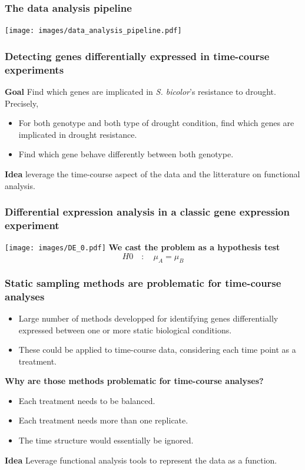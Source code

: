 \documentclass[xcolor=dvipsnames]{beamer}
\begin{document}
\begin{frame}
\frametitle{The data analysis pipeline}
\begin{center}
\texttt{[image: images/data\_analysis\_pipeline.pdf]}
\end{center}
\end{frame}

\begin{frame}
\frametitle{Detecting genes differentially expressed in time-course
experiments}

\textbf{\color{Blue} Goal} \quad Find which genes are implicated in \textit{S.
bicolor}'s resistance to drought. Precisely,
\begin{itemize}[label={$\bullet$}]
\item For both genotype and both type of drought condition, find which genes
are implicated in drought resistance.
\item Find which gene behave differently between both genotype.
\end{itemize}
\vspace{1em}

\textbf{\color{Blue} Idea} \quad leverage the time-course aspect of the data and the
litterature on functional analysis.
\end{frame}

\begin{frame}
\frametitle{Differential expression analysis in a classic gene expression experiment}
\texttt{[image: images/DE\_0.pdf]}
\vspace{-5em}
{\bf We cast the problem as a hypothesis test}
\begin{equation*}
H0 \quad : \quad \mu_A = \mu_B
\end{equation*}
\end{frame}

\begin{frame}
\frametitle{Static sampling methods are problematic for time-course analyses}
\begin{itemize}[label={$\bullet$}]
\item Large number of methods developped for identifying genes differentially
expressed between one or more static biological conditions.
\item These could be applied to time-course data, considering each time point
as a treatment.
\end{itemize}

\vspace{1em}
{\bf Why are those methods problematic for time-course analyses?}
\begin{itemize}[label={$\bullet$}]
\item Each treatment needs to be balanced.
\item Each treatment needs more than one replicate.
\item The time structure would essentially be ignored.
\end{itemize}

\vspace{1em}
{\bf Idea} \quad
Leverage functional analysis tools to represent the data as a function.
\end{frame}
\end{document}
